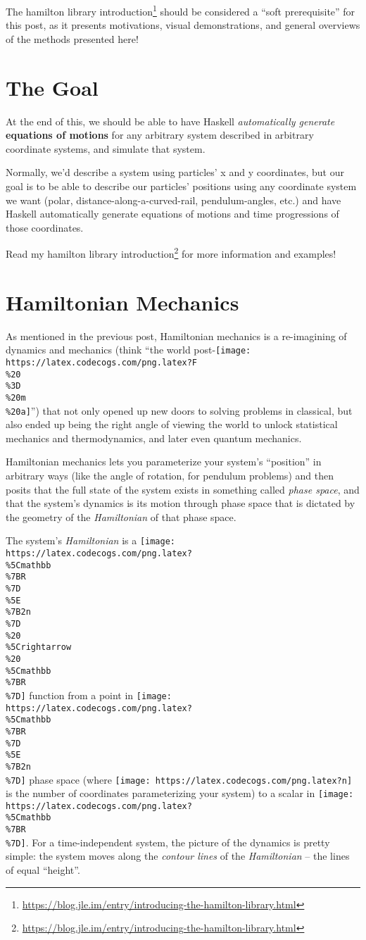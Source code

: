 \documentclass[]{article}
\renewcommand{\href}[2]{#2\footnote{\url{#1}}}
\begin{document}
The
\href{https://blog.jle.im/entry/introducing-the-hamilton-library.html}{hamilton
library introduction} should be considered a ``soft prerequisite'' for this
post, as it presents motivations, visual demonstrations, and general overviews
of the methods presented here!

\hypertarget{the-goal}{%
\section{The Goal}\label{the-goal}}

At the end of this, we should be able to have Haskell \emph{automatically
generate} \textbf{equations of motions} for any arbitrary system described in
arbitrary coordinate systems, and simulate that system.

Normally, we'd describe a system using particles' x and y coordinates, but our
goal is to be able to describe our particles' positions using any coordinate
system we want (polar, distance-along-a-curved-rail, pendulum-angles, etc.) and
have Haskell automatically generate equations of motions and time progressions
of those coordinates.

Read \href{https://blog.jle.im/entry/introducing-the-hamilton-library.html}{my
hamilton library introduction} for more information and examples!

\hypertarget{hamiltonian-mechanics}{%
\section{Hamiltonian Mechanics}\label{hamiltonian-mechanics}}

As mentioned in the previous post, Hamiltonian mechanics is a re-imagining of
dynamics and mechanics (think ``the world
post-\texttt{[image: https://latex.codecogs.com/png.latex?F\\\%20\\\%3D\\\%20m\\\%20a]}'')
that not only opened up new doors to solving problems in classical, but also
ended up being the right angle of viewing the world to unlock statistical
mechanics and thermodynamics, and later even quantum mechanics.

Hamiltonian mechanics lets you parameterize your system's ``position'' in
arbitrary ways (like the angle of rotation, for pendulum problems) and then
posits that the full state of the system exists in something called \emph{phase
space}, and that the system's dynamics is its motion through phase space that is
dictated by the geometry of the \emph{Hamiltonian} of that phase space.

The system's \emph{Hamiltonian} is a
\texttt{[image: https://latex.codecogs.com/png.latex?\\\%5Cmathbb\\\%7BR\\\%7D\\\%5E\\\%7B2n\\\%7D\\\%20\\\%5Crightarrow\\\%20\\\%5Cmathbb\\\%7BR\\\%7D]}
function from a point in
\texttt{[image: https://latex.codecogs.com/png.latex?\\\%5Cmathbb\\\%7BR\\\%7D\\\%5E\\\%7B2n\\\%7D]}
phase space (where \texttt{[image: https://latex.codecogs.com/png.latex?n]} is
the number of coordinates parameterizing your system) to a scalar in
\texttt{[image: https://latex.codecogs.com/png.latex?\\\%5Cmathbb\\\%7BR\\\%7D]}. For
a time-independent system, the picture of the dynamics is pretty simple: the
system moves along the \emph{contour lines} of the \emph{Hamiltonian} -- the
lines of equal ``height''.
\end{document}
